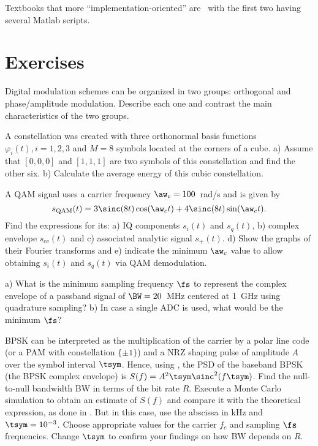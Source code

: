 Textbooks that more ``implementation-oriented'' are~\cite{Farhang10,Johnson11,Miao07} with
the first two having several Matlab scripts. 


\section{Exercises}

\begin{exercises}

\item Digital modulation schemes can be organized in two groups: orthogonal and phase/amplitude modulation. Describe each one and contrast the main characteristics of the two groups.

\item A constellation was created with three orthonormal basis functions $\varphi_i(t), i=1,2,3$ and $M=8$ symbols located at the corners of a cube. a) Assume that $[0,0,0]$ and $[1,1,1]$ are two symbols of this constellation and find the other six. b) Calculate the average energy of this cubic constellation.

\item A QAM signal uses a carrier frequency $\aw_c=100$~rad/s and is given by 
\[
s_{\textrm{QAM}}(t) = 3\sinc(8t) \cos(\aw_c t) + 4\sinc(8t) \sin(\aw_c t).
\]
Find the expressions for its: a) IQ components $s_i(t)$ and $s_q(t)$, b) complex envelope $s_{\textrm{ce}}(t)$ and c) associated analytic signal $s_{\textrm{+}}(t)$. d) Show the graphs of their Fourier transforms and e) indicate the minimum $\aw_c$ value to allow obtaining $s_i(t)$ and $s_q(t)$ via QAM demodulation.

\item a) What is the minimum sampling frequency $\fs$ to represent the complex envelope of a passband signal of $\BW=20$~MHz centered at 1~GHz using quadrature sampling? b) In case a single ADC is used, what would be the minimum $\fs$?

\item BPSK can be interpreted as the multiplication of the carrier by a polar line code (or a PAM with constellation $\{\pm 1\}$) and a NRZ shaping pulse of amplitude $A$ over the symbol interval $\tsym$. Hence, using , the PSD of the baseband BPSK (the BPSK complex envelope) is $S(f)=A^2 \tsym \sinc^2(f \tsym)$. Find the null-to-null bandwidth BW in terms of the bit rate $R$. Execute a Monte Carlo simulation to obtain an estimate of $S(f)$ and compare it with the theoretical expression, as done in . But in this case, use the abscissa in kHz and $\tsym = 10^{-3}$. Choose appropriate values for the carrier $f_c$ and sampling $\fs$ frequencies. Change $\tsym$ to confirm your findings on how BW depends on $R$.


\end{exercises}
